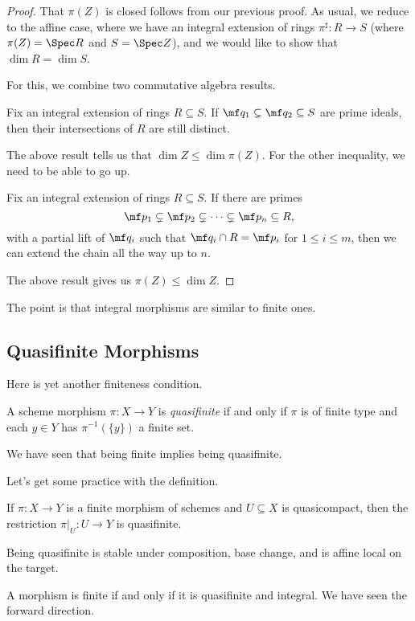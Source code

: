 \documentclass[../notes.tex]{subfiles}
\begin{document}
\begin{proof}
	That $\pi(Z)$ is closed follows from our previous proof. As usual, we reduce to the affine case, where we have an integral extension of rings $\pi^\sharp\colon R\to S$ (where $\pi(Z)=\Spec R$ and $S=\Spec Z$), and we would like to show that $\dim R=\dim S$.

	For this, we combine two commutative algebra results.
	\begin{lemma}
		Fix an integral extension of rings $R\subseteq S$. If $\mf q_1\subsetneq\mf q_2\subseteq S$ are prime ideals, then their intersections of $R$ are still distinct.
	\end{lemma}
	The above result tells us that $\dim Z\le\dim\pi(Z)$. For the other inequality, we need to be able to go up.
	\begin{lemma}[Going up]
		Fix an integral extension of rings $R\subseteq S$. If there are primes
		\[\mf p_1\subsetneq\mf p_2\subsetneq\cdots\subsetneq\mf p_n\subseteq R,\]
		with a partial lift of $\mf q_i$ such that $\mf q_i\cap R=\mf p_i$ for $1\le i\le m$, then we can extend the chain all the way up to $n$.
	\end{lemma}
	The above result gives us $\pi(Z)\le\dim Z$.
\end{proof}
The point is that integral morphisms are similar to finite ones.

\subsection{Quasifinite Morphisms}
Here is yet another finiteness condition.
\begin{definition}[Quasifinite]
	A scheme morphism $\pi\colon X\to Y$ is \textit{quasifinite} if and only if $\pi$ is of finite type and each $y\in Y$ has $\pi^{-1}(\{y\})$ a finite set.
\end{definition}
\begin{remark}
	We have seen that being finite implies being quasifinite.
\end{remark}
Let's get some practice with the definition.
\begin{lemma}
	If $\pi\colon X\to Y$ is a finite morphism of schemes and $U\subseteq X$ is quasicompact, then the restriction $\pi|_U\colon U\to Y$ is quasifinite.
\end{lemma}
\begin{remark}
	Being quasifinite is stable under composition, base change, and is affine local on the target.
\end{remark}
\begin{remark}
	A morphism is finite if and only if it is quasifinite and integral. We have seen the forward direction.
\end{remark}
\end{document}
